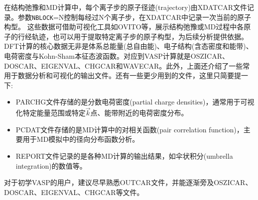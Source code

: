在结构弛豫和\textrm{MD}计算中，每个离子步的原子径迹(\textrm{trajectory})由\textrm{XDATCAR}文件记录。参数\texttt{NBLOCK}=\textrm{N}控制每经过\textrm{N}个离子步，在\textrm{XDATCAR}中记录一次当前的原子构型。
{\fontsize{8.2pt}{6.2pt}\selectfont{
}}
这些数据可借助可视化工具如\textrm{OVITO}等，展示结构弛豫或\textrm{MD}过程中各原子的行经轨迹，也可以用于提取特定离子步的原子构型，为后续分析提供依据。
%
%
%
%
%
%
%
\textrm{DFT}计算的核心数据无非是体系总能量(总自由能)、电子结构(含态密度和能带)、电荷密度与\textrm{Kohn-Sham}本征态波函数。对应到\textrm{VASP}计算就是\textrm{OSZICAR}、\textrm{DOSCAR}、\textrm{EIGENVAL}、\textrm{CHGCAR}和\textrm{WAVECAR}。此外，上面还介绍了一些常用于数据分析和可视化的输出文件。还有一些更少用到的文件，这里只简要提一下:
\begin{itemize}
	\item \textrm{PARCHG}文件存储的是分数电荷密度\textrm{(partial charge densities)}，通常用于可视化特定能量范围或特定$\vec k$点、能带附近的电荷密度分布。
	\item \textrm{PCDAT}文件存储的是\textrm{MD}计算中的对相关函数\textrm{(pair correlation function)}，主要用于\textrm{MD}模拟中的径向分布函数分析。
	\item \textrm{REPORT}文件记录的是各种\textrm{MD}计算的输出结果，如伞状积分\textrm{(umbrella integration)}的数值等。
\end{itemize}
对于初学\textrm{VASP}的用户，建议尽早熟悉\textrm{OUTCAR}文件，并能逐渐旁及\textrm{OSZICAR}、\textrm{DOSCAR}、\textrm{EIGENVAL}、\textrm{CHGCAR}等文件。
%
%
%
%
%
%
%
%
